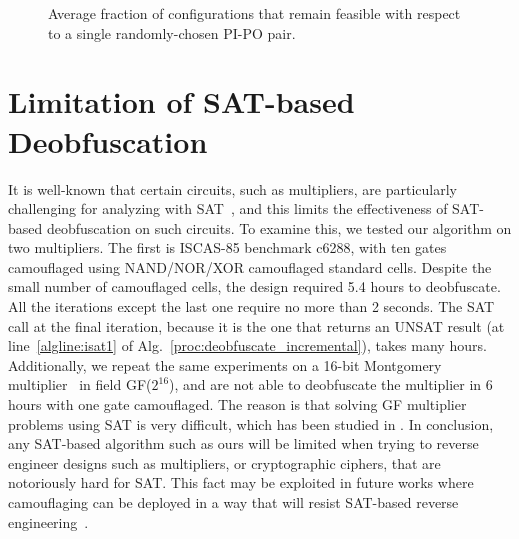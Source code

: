 \documentclass[proposal]{umassthesis}  %
\begin{document}
\begin{figure}[!hbt]
 \centering
   \caption{Average fraction of configurations that remain feasible with respect to a single randomly-chosen PI-PO pair.}
    \vspace{-2mm}
    \label{fig:random_pi_po_test}
\end{figure}










\section{Limitation of SAT-based Deobfuscation}

It is well-known that certain circuits, such as multipliers, are particularly challenging for analyzing with SAT~\cite{cook1997finding}, and this limits the effectiveness of SAT-based deobfuscation on such circuits. To examine this, we tested our algorithm on two multipliers. The first is ISCAS-85 benchmark c6288, with ten gates camouflaged using NAND/NOR/XOR camouflaged standard cells. Despite the small number of camouflaged cells, the design required 5.4 hours to deobfuscate. All the iterations except the last one require no more than 2 seconds. The SAT call at the final iteration, because it is the one that returns an UNSAT result (at line~\ref{algline:isat1} of Alg.~\ref{proc:deobfuscate_incremental}), takes many hours. Additionally, we repeat the same experiments on a 16-bit Montgomery multiplier~\cite{koc1998montgomery} in field GF($2^{16}$), and are not able to deobfuscate the multiplier in 6 hours with one gate camouflaged. The reason is that solving GF multiplier problems using SAT is very difficult, which has been studied in \cite{lv2012efficient}. In conclusion, any SAT-based algorithm such as ours will be limited when trying to reverse engineer designs such as multipliers, or cryptographic ciphers, that are notoriously hard for SAT. This fact may be exploited in future works where camouflaging can be deployed in a way that will resist SAT-based reverse engineering~\cite{yasin-15}.
\end{document}
